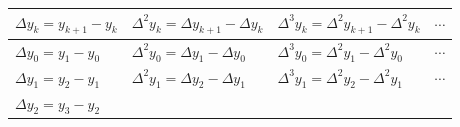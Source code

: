 \documentclass[openany]{book}
\begin{document}
\begin{longtable}[]{@{}llll@{}}
\toprule
\begin{minipage}[b]{0.22\columnwidth}\raggedright
\(\Delta y_k = y_{k+1} - y_k\)\strut
\end{minipage} & \begin{minipage}[b]{0.29\columnwidth}\raggedright
\(\Delta^2 y_k = \Delta y_{k+1} - \Delta y_k\)\strut
\end{minipage} & \begin{minipage}[b]{0.31\columnwidth}\raggedright
\(\Delta^3 y_k = \Delta^2 y_{k+1} - \Delta^2 y_k\)\strut
\end{minipage} & \begin{minipage}[b]{0.06\columnwidth}\raggedright
\(\cdots\)\strut
\end{minipage}\tabularnewline
\midrule
\endhead
\begin{minipage}[t]{0.22\columnwidth}\raggedright
\(\Delta y_0 = y_1 - y_0\)\strut
\end{minipage} & \begin{minipage}[t]{0.29\columnwidth}\raggedright
\(\Delta^2 y_0 = \Delta y_{1} - \Delta y_0\)\strut
\end{minipage} & \begin{minipage}[t]{0.31\columnwidth}\raggedright
\(\Delta^3 y_0 = \Delta^2 y_{1} - \Delta^2 y_0\)\strut
\end{minipage} & \begin{minipage}[t]{0.06\columnwidth}\raggedright
\(\cdots\)\strut
\end{minipage}\tabularnewline
\begin{minipage}[t]{0.22\columnwidth}\raggedright
\(\Delta y_1 = y_2 - y_1\)\strut
\end{minipage} & \begin{minipage}[t]{0.29\columnwidth}\raggedright
\(\Delta^2 y_1 = \Delta y_{2} - \Delta y_1\)\strut
\end{minipage} & \begin{minipage}[t]{0.31\columnwidth}\raggedright
\(\Delta^3 y_1 = \Delta^2 y_{2} - \Delta^2 y_1\)\strut
\end{minipage} & \begin{minipage}[t]{0.06\columnwidth}\raggedright
\(\cdots\)\strut
\end{minipage}\tabularnewline
\begin{minipage}[t]{0.22\columnwidth}\raggedright
\(\Delta y_2 = y_3 - y_2\)\strut
\end{minipage} & \begin{minipage}[t]{0.29\columnwidth}\raggedright

\end{minipage}
\end{longtable}
\end{document}
